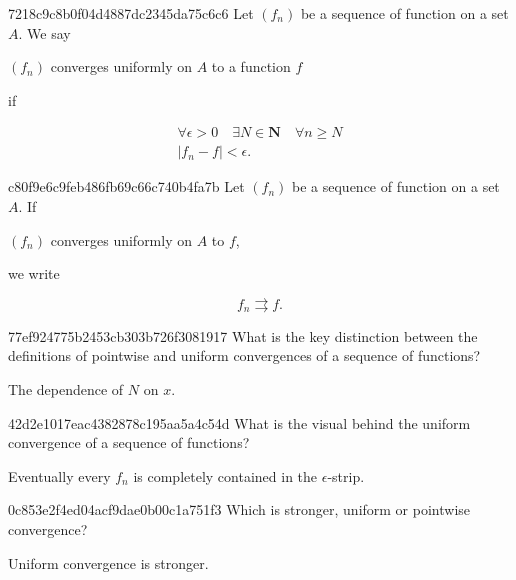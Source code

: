 \begin{note}{7218c9c8b0f04d4887dc2345da75c6c6}
    Let \({ (f_n) }\) be a sequence of function on a set \({ A }\).
    We say \begin{icloze}{2}\({ (f_n) }\) converges uniformly on \({ A }\) to a function \({ f }\)\end{icloze} if
    \begin{icloze}{1}
        \[
            \begin{gathered}
                \forall \epsilon > 0  \quad \exists N \in \mathbf{N} \quad \forall n \geq N \\
                \left\lvert f_n - f \right\rvert < \epsilon.
            \end{gathered}
        \]
    \end{icloze}
\end{note}

\begin{note}{c80f9e6c9feb486fb69c66c740b4fa7b}
    Let \({ (f_n) }\) be a sequence of function on a set \({ A }\).
    If \begin{icloze}{2}\({ (f_n) }\) converges uniformly on \({ A }\) to \({ f }\),\end{icloze} we write
    \begin{icloze}{1}
        \[
            f_n \rightrightarrows f.
        \]
    \end{icloze}
\end{note}

\begin{note}{77ef924775b2453cb303b726f3081917}
    What is the key distinction between the definitions of pointwise and uniform convergences of a sequence of functions?

    \begin{cloze}{1}
        The dependence of \({ N }\) on \({ x }\).
    \end{cloze}
\end{note}

\begin{note}{42d2e1017eac4382878c195aa5a4c54d}
    What is the visual behind the uniform convergence of a sequence of functions?

    \begin{cloze}{1}
        Eventually every \({ f_n }\) is completely contained in the \({ \epsilon }\)-strip.
    \end{cloze}
\end{note}

\begin{note}{0c853e2f4ed04acf9dae0b00c1a751f3}
    Which is stronger, uniform or pointwise convergence?

    \begin{cloze}{1}
        Uniform convergence is stronger.
    \end{cloze}
\end{note}

